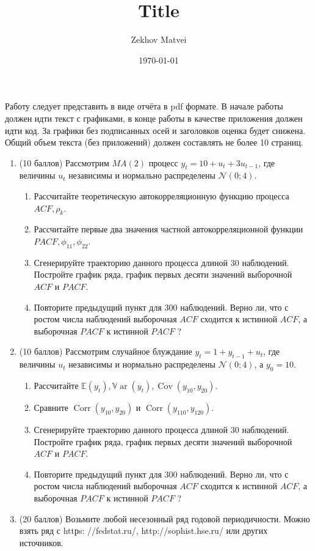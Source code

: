 \documentclass[a4paper,12pt]{article}
\author{Zekhov Matvei}
\title{Title}
\date{\today}
\begin{document}
		Работу следует представить в виде отчёта в pdf формате. В начале работы должен идти текст с графиками, в конце работы в качестве приложения должен идти код. За графики без подписанных осей и заголовков оценка будет снижена. Общий объем текста (без приложений) должен составлять не более 10 страниц.
	\begin{enumerate}
			\item (10 баллов) Рассмотрим $M A(2)$ процесс $y_t=10+u_t+3 u_{t-1}$, где величины $u_t$ независимы и нормально распределены $\mathcal{N}(0 ; 4)$.
		\begin{enumerate}
				\item Рассчитайте теоретическую автокорреляционную функцию процесса $A C F, \rho_k$.
			\item Рассчитайте первые два значения частной автокорреляционной функции $P A C F, \phi_{11}, \phi_{22}$.
			\item Сгенерируйте траекторию данного процесса длиной 30 наблюдений. Постройте график ряда, график первых десяти значений выборочной $A C F$ и $P A C F$.
			\item Повторите предыдущий пункт для 300 наблюдений. Верно ли, что с ростом числа наблюдений выборочная $A C F$ сходится к истинной $A C F$, а выборочная $P A C F$ к истинной $P A C F$ ?
		\end{enumerate}
	
	\item (10 баллов) Рассмотрим случайное блуждание $y_t=1+y_{t-1}+u_t$, где величины $u_t$ независимы и нормально распределены $\mathcal{N}(0 ; 4)$, а $y_0=10$.
	
	\begin{enumerate}
		\item Рассчитайте $\mathbb{E}\left(y_t\right), \mathbb{V} \operatorname{ar}\left(y_t\right), \operatorname{Cov}\left(y_{10}, y_{20}\right)$.
		\item Сравните $\operatorname{Corr}\left(y_{10}, y_{20}\right)$ и $\operatorname{Corr}\left(y_{110}, y_{120}\right)$.
		\item Сгенерируйте траекторию данного процесса длиной 30 наблюдений. Постройте график ряда, график первых десяти значений выборочной $A C F$ и $P A C F$.
		\item Повторите предыдущий пункт для 300 наблюдений. Верно ли, что с ростом числа наблюдений выборочная $A C F$ сходится к истинной $A C F$, а выборочная $P A C F$ к истинной $P A C F$ ?
	\end{enumerate}

	\item (20 баллов) Возьмите любой несезонный ряд годовой периодичности. Можно взять ряд с httрs: //fedstat.ru/, http://sophist.hse.ru/ или других источников.
	

\end{enumerate}
\end{document}

